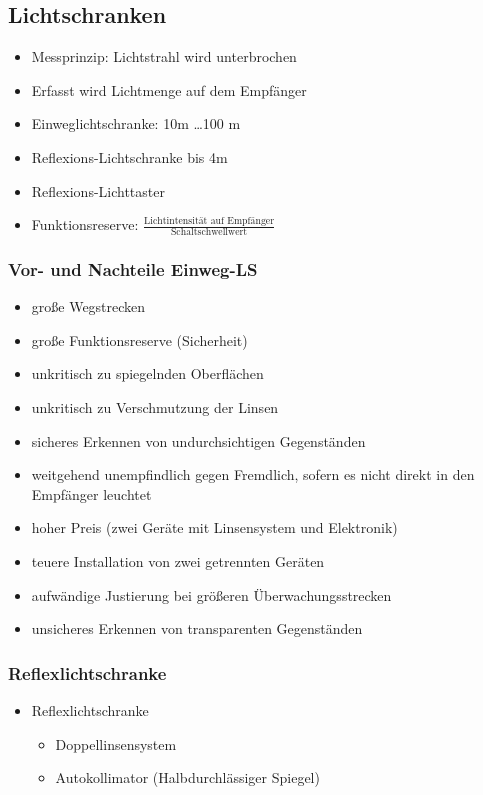 \documentclass[a4paper]{scrartcl}
\begin{document}
\subsection{Lichtschranken}
\begin{itemize}
\item Messprinzip: Lichtstrahl wird unterbrochen
\item Erfasst wird Lichtmenge auf dem Empfänger
\item Einweglichtschranke: 10m \dots 100 m
\item Reflexions-Lichtschranke bis 4m
\item Reflexions-Lichttaster
\item Funktionsreserve: $\frac{\text{Lichtintensität auf Empfänger}}{\text{Schaltschwellwert}}$
\end{itemize}
\subsubsection{Vor- und Nachteile Einweg-LS}
\begin{itemize}
\item große Wegstrecken
\item große Funktionsreserve (Sicherheit)
\item unkritisch zu spiegelnden Oberflächen
\item unkritisch zu Verschmutzung der Linsen
\item sicheres Erkennen von undurchsichtigen Gegenständen
\item weitgehend unempfindlich gegen Fremdlich, sofern es nicht direkt in den Empfänger leuchtet
\item hoher Preis (zwei Geräte mit Linsensystem und Elektronik)
\item teuere Installation von zwei getrennten Geräten
\item aufwändige Justierung bei größeren Überwachungsstrecken
\item unsicheres Erkennen von transparenten Gegenständen
\end{itemize}

\subsubsection{Reflexlichtschranke}
\begin{itemize}
\item Reflexlichtschranke
    \begin{itemize}
    \item Doppellinsensystem
    \item Autokollimator (Halbdurchlässiger Spiegel)
    \end{itemize}
\end{itemize}
\end{document}
